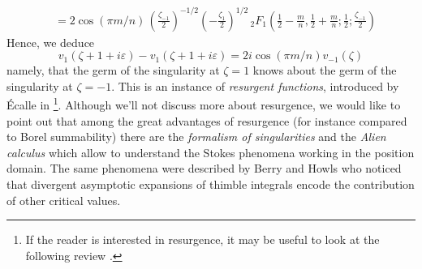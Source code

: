 \documentclass{article}
\theoremstyle{definition}
\theoremstyle{plain}
\begin{document}
{\begin{align*}
&=2\cos(\pi m/n)\, \left(\frac{\zeta_{-1}}{2}\right)^{-1/2} \left(-\frac{\zeta_{1}}{2}\right)^{1/2}\, {}_2F_1\left(\frac{1}{2}-\frac{m}{n},\frac{1}{2}+\frac{m}{n};\frac{1}{2};\frac{\zeta_{-1}}{2}\right)
\end{align*}
Hence, we deduce  
\begin{equation}\label{resurgent-relation-1}
    v_1(\zeta+1+i\varepsilon)-v_1(\zeta+1+i\varepsilon)=2i \cos(\pi m/n)  v_{-1}(\zeta)
\end{equation}
namely, that the germ of the singularity at $\zeta=1$ knows about the germ of the singularity at $\zeta=-1$. This is an instance of \textit{resurgent functions}, introduced by \'Ecalle in \cite{EcalleI,EcalleII,EcalleIII}\footnote{If the reader is interested in resurgence, it may be useful to look at the following review \cite{diverg-resurg-i,Dorigoni,aniceto2019primer}.}. Although we’ll not discuss more about resurgence, we would like to point out that among the great advantages of resurgence (for instance compared to Borel summability) there are the \textit{formalism of singularities} and the \textit{Alien calculus} which allow to understand the Stokes phenomena working in the position domain. The same phenomena were described by Berry and Howls \cite{Berry_Howls} who noticed that divergent asymptotic expansions of thimble integrals encode the contribution of other critical values. 

}
\end{document}
